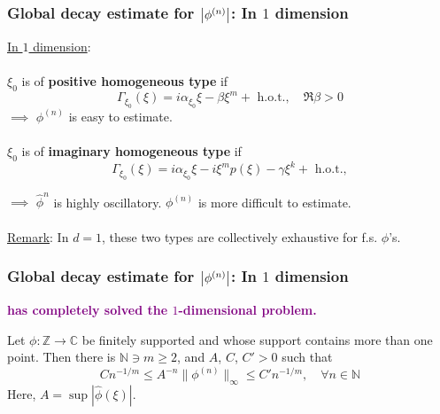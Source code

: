 \documentclass{beamer}
\theoremstyle{definition}
\begin{document}
\begin{frame}
\frametitle{Global decay estimate for $\abs{\phi^{(n)}}$: In $1$ dimension}

\underline{In $1$ dimension}:\\
$\,$\\

$\xi_0$ is of \textbf{positive homogeneous type} if
\begin{equation*}
\Gamma_{\xi_0}(\xi) = i\alpha_{\xi_0} \xi- \beta \xi^m + \text{ h.o.t.}, \quad \Re{\beta} >0
\end{equation*}
$\implies$ $\phi^{(n)}$ is easy to estimate.\\
$\,$\\

$\xi_0$ is of \textbf{imaginary homogeneous type} if
\begin{equation*}
\Gamma_{\xi_0}(\xi) = i\alpha_{\xi_0} \xi - i\xi^mp(\xi) - \gamma \xi^k   + \text{ h.o.t.},  
\end{equation*}

$\implies$ $\widehat{\phi}^n$ is highly oscillatory. $\phi^{(n)}$ is more difficult to estimate.\\
$\,$\\
\underline{Remark}: In $d=1$, these two types are collectively exhaustive for f.s. $\phi$'s.
\end{frame}




\begin{frame}
\frametitle{Global decay estimate for $\abs{\phi^{(n)}}$: In $1$ dimension}




\begin{center}
	\textbf{\textcolor{purple}{\cite{randles_convolution_2015} has completely solved the $1$-dimensional problem. }  }
\end{center}


\begin{theorem}
	Let $\phi : \mathbb{Z} \to \mathbb{C}$ be finitely supported and whose support contains more than one point. Then there is $\mathbb{N} \ni m \geq 2$, and $A$, $C$, $C' > 0$ such that 
	\begin{equation*}
	Cn^{-1/m} \leq A^{-n}\| \phi^{(n)} \|_\infty \leq C' n^{-1/m}, \quad \forall n\in \mathbb{N}
	\end{equation*}
	Here, $A=\sup|\widehat{\phi}(\xi)|$.
\end{theorem}


\end{frame}
\end{document}
